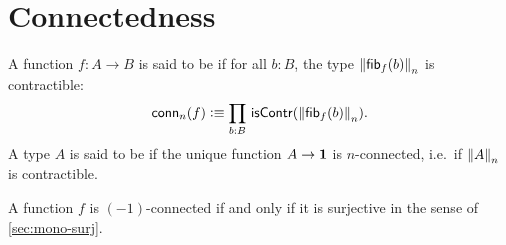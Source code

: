 \documentclass[hott-all.tex]{subfiles}
\begin{document}
\section{Connectedness}
% 
% 
\begin{defn}
A function $f:A\to B$ is said to be 
%
%
if for all $b:B$, the type $\trunc n{\hfiber f b}$ is contractible:
\begin{equation*}
  \mathsf{conn}_n(f)\defeq \prd{b:B}\iscontr(\trunc n{\hfiber{f}b}).
\end{equation*}
A type $A$ is said to be 
%
%
 if the unique function $A\to\unit$ is $n$-connected, i.e.\ if $\trunc nA$ is contractible.
\end{defn}
% 
% 
\begin{lem}
  A function $f$ is $(-1)$-connected if and only if it is surjective in the sense of \cref{sec:mono-surj}.
\end{lem}
% 
% 
\end{document}
